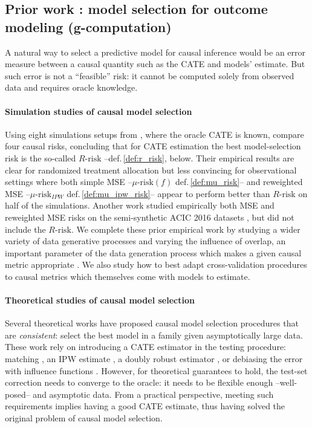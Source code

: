 \documentclass[a4paper,num-refs]{oup-contemporary}%
\begin{document}
\subsection{Prior work : model selection for outcome modeling (g-computation)}\label{apd:prior_work}

A natural way to select a predictive model for causal inference would be
an error measure between a causal quantity such as the CATE and models' estimate. But such error is
not a ``feasible'' risk: it cannot be computed solely from observed data
and requires oracle knowledge.


\paragraph{Simulation studies of causal model selection}

Using eight simulations setups from \cite{powers_methods_2018}, where
the oracle CATE is known, \cite{schuler_comparison_2018} compare four
causal risks, concluding that for CATE estimation the best
model-selection risk is the so-called $R\text{-risk}$
\cite{nie_quasioracle_2017} --def.\,\ref{def:r_risk}, below. Their
empirical results are clear for randomized treatment allocation but less
convincing for observational settings where both simple MSE --$\mu\text{-risk}(f)$ def.\,\ref{def:mu_risk}-- and
reweighted MSE --$\mu\text{-risk}_{IPW}$ def.\,\ref{def:mu_ipw_risk}--
appear to perform better than $R\text{-risk}$ on half of the simulations.
Another work \cite{alaa_validating_2019} studied empirically both MSE and
reweighted MSE risks on the semi-synthetic ACIC 2016 datasets
\cite{dorie_automated_2019}, but did not include the $R\text{-risk}$. We complete these
prior empirical work by studying a wider variety of data generative
processes and varying the influence of overlap, an important parameter of
the data generation process which makes a given causal metric appropriate
\cite{damour_overlap_2020}. We also study how to best adapt
cross-validation procedures to causal metrics which themselves come with
models to estimate.

\paragraph{Theoretical studies of causal model selection}

Several theoretical works have proposed causal model selection procedures
that are \emph{consistent}: select the best model in a family given
asymptotically large data. These work rely on introducing a
CATE estimator in the testing procedure: matching
\cite{rolling_model_2014}, an IPW estimate
\cite{gutierrez_causal_2016}, a doubly robust estimator
\cite{saito_counterfactual_2020}, or debiasing the error with influence
functions \cite{alaa_validating_2019}. However, for theoretical
guarantees to hold, the test-set correction needs to converge to the
oracle: it needs to be flexible enough --well-posed-- and asymptotic
data. From a practical perspective, meeting such requirements
implies having a good CATE estimate, thus having solved
the original problem of causal model selection.
\end{document}
